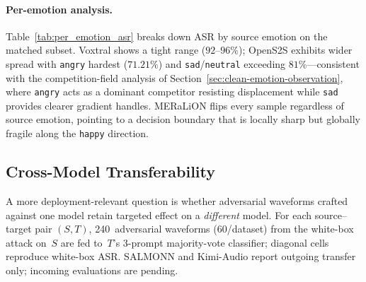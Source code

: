 \paragraph{Per-emotion analysis.}
Table~\ref{tab:per_emotion_asr} breaks down ASR by source emotion on the matched subset.
Voxtral shows a tight range ($92$--$96\%$); OpenS2S exhibits wider spread with \texttt{angry} hardest ($71.21\%$) and \texttt{sad}/\texttt{neutral} exceeding $81\%$---consistent with the competition-field analysis of Section~\ref{sec:clean-emotion-observation}, where \texttt{angry} acts as a dominant competitor resisting displacement while \texttt{sad} provides clearer gradient handles.
MERaLiON flips every sample regardless of source emotion, pointing to a decision boundary that is locally sharp but globally fragile along the \texttt{happy} direction.


\subsection{Cross-Model Transferability}
\label{sec:exp_transfer}

A more deployment-relevant question is whether adversarial waveforms crafted against one model retain targeted effect on a \emph{different} model.
For each source--target pair $(S,T)$, 240~adversarial waveforms (60/dataset) from the white-box attack on~$S$ are fed to~$T$'s 3-prompt majority-vote classifier; diagonal cells reproduce white-box ASR.
SALMONN and Kimi-Audio report outgoing transfer only; incoming evaluations are pending.

